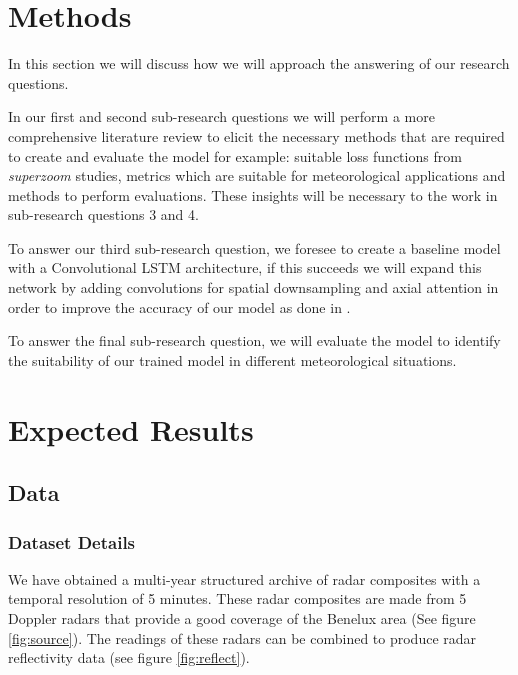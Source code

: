 \documentclass[acmtog, authorversion]{acmart}
\begin{document}
\section{Methods}


In this section we will discuss how we will approach the answering of our research questions.
\medskip

In our first and second sub-research questions we will perform a more comprehensive literature review to elicit the necessary methods that are required to create and evaluate the  model for example: suitable loss functions from \textit{superzoom} studies, metrics which are suitable for meteorological applications and methods to perform evaluations. These insights will be necessary to the work in sub-research questions 3 and 4.
\medskip

To answer our third sub-research question, we foresee to create a baseline model with a Convolutional LSTM architecture, if this succeeds we will expand this network by adding convolutions for spatial downsampling and axial attention in order to improve the accuracy of our model as done in \cite{sønderby2020metnet}.
\medskip

To answer the final sub-research question, we will evaluate the model to identify the suitability of our trained model in different meteorological situations.

\section{Expected Results}

\subsection{Data}

\subsubsection{Dataset Details}

We have obtained a multi-year structured archive of radar composites with a temporal resolution of 5 minutes. These radar composites are made from 5 Doppler radars that provide a good coverage of the Benelux area (See figure \ref{fig:source}). The readings of these radars can be combined to produce radar reflectivity data (see figure \ref{fig:reflect}).
\medskip
\end{document}
